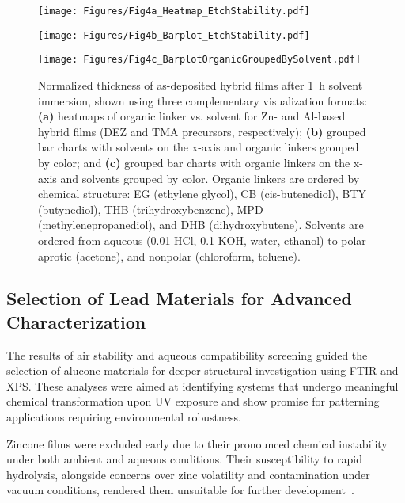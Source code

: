 \begin{figure}[H]
  \centering

  \texttt{[image: Figures/Fig4a\_Heatmap\_EtchStability.pdf]}
  \vspace{1em}

  \texttt{[image: Figures/Fig4b\_Barplot\_EtchStability.pdf]}
  \vspace{1em}

  \texttt{[image: Figures/Fig4c\_BarplotOrganicGroupedBySolvent.pdf]}

  \caption{
    Normalized thickness of as-deposited hybrid films after \SI{1}{\hour} solvent immersion, shown using three complementary visualization formats:
    \textbf{(a)} heatmaps of organic linker vs. solvent for Zn- and Al-based hybrid films (DEZ and TMA precursors, respectively);
    \textbf{(b)} grouped bar charts with solvents on the x-axis and organic linkers grouped by color; and
    \textbf{(c)} grouped bar charts with organic linkers on the x-axis and solvents grouped by color.
    Organic linkers are ordered by chemical structure: EG (ethylene glycol), CB (cis-butenediol), BTY (butynediol), THB (trihydroxybenzene), MPD (methylenepropanediol), and DHB (dihydroxybutene).
    Solvents are ordered from aqueous (\SI{0.01}{\molar} HCl, \SI{0.1}{\molar} KOH, water, ethanol) to polar aprotic (acetone), and nonpolar (chloroform, toluene).
  }
  \label{fig:developer_visualization_comparison}
\end{figure}




\subsection{Selection of Lead Materials for Advanced Characterization}

The results of air stability and aqueous compatibility screening guided the selection of alucone materials for deeper structural investigation using FTIR and XPS. These analyses were aimed at identifying systems that undergo meaningful chemical transformation upon UV exposure and show promise for patterning applications requiring environmental robustness.

Zincone films were excluded early due to their pronounced chemical instability under both ambient and aqueous conditions. Their susceptibility to rapid hydrolysis, alongside concerns over zinc volatility and contamination under vacuum conditions, rendered them unsuitable for further development~\cite{Richey2019}.

